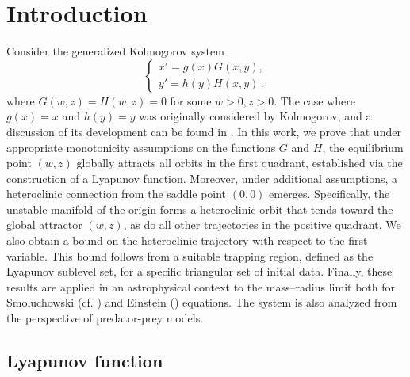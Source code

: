 \documentclass[reqno,10pt]{article}
\theoremstyle{definition}
\numberwithin{equation}{section}
\numberwithin{theorem}{section}
\begin{document}
\section{Introduction}  %
Consider the generalized Kolmogorov system
\begin{equation}\label{Kol}
	\begin{cases}
		x'=g(x)G(x,y),\\
		y'=h(y)H(x,y)\,.
	\end{cases}
\end{equation}
where $G(w,z)=H(w,z)=0$ for some $w>0,z>0$. The case where $g(x)=x$ and $h(y)=y$ was originally considered by Kolmogorov, and a discussion of its development can be found in \cite{bibref7}. In this work, we prove that under appropriate monotonicity assumptions on the functions $G$ and $H$, the equilibrium point $(w,z)$ globally attracts all  orbits in the first quadrant, established via the construction of a Lyapunov function. Moreover, under additional assumptions, a heteroclinic connection from the saddle point $(0,0)$ emerges. Specifically, the unstable manifold of the origin forms a heteroclinic orbit that tends toward the global attractor $(w,z)$, as do all other trajectories in the positive quadrant. We also obtain a bound on the heteroclinic trajectory with respect to the first variable. This bound follows from a suitable trapping region, defined as the Lyapunov sublevel set, for a specific triangular set of initial data. Finally, these results are applied in an astrophysical context to the mass--radius limit both for Smoluchowski (cf. \cite{CMP, JDE}) and Einstein (\cite{MMAS, DCDS}) equations. The system is also analyzed from the perspective of predator-prey models.

\subsection{Lyapunov function} %
\end{document}
